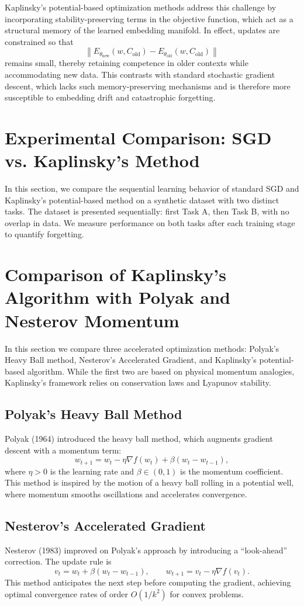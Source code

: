 \documentclass[12pt]{article}
\begin{document}
Kaplinsky's potential-based optimization methods address this challenge by incorporating 
stability-preserving terms in the objective function, which act as a structural memory 
of the learned embedding manifold. In effect, updates are constrained so that
\[
\left\| E_{\theta_{\mathrm{new}}}(w, C_{\mathrm{old}}) - E_{\theta_{\mathrm{old}}}(w, C_{\mathrm{old}}) \right\|
\]
remains small, thereby retaining competence in older contexts while accommodating new data. 
This contrasts with standard stochastic gradient descent, which lacks such 
memory-preserving mechanisms and is therefore more susceptible to embedding drift 
and catastrophic forgetting.

\section{Experimental Comparison: SGD vs. Kaplinsky's Method}

In this section, we compare the sequential learning behavior of standard SGD 
and Kaplinsky's potential-based method on a synthetic dataset with two distinct tasks. 
The dataset is presented sequentially: first Task A, then Task B, with no overlap in data. 
We measure performance on both tasks after each training stage to quantify forgetting.
\section{Comparison of Kaplinsky's Algorithm with Polyak and Nesterov Momentum}

In this section we compare three accelerated optimization methods: 
Polyak’s Heavy Ball method, Nesterov’s Accelerated Gradient, and Kaplinsky’s 
potential-based algorithm. While the first two are based on physical 
momentum analogies, Kaplinsky’s framework relies on conservation laws 
and Lyapunov stability.

\subsection{Polyak’s Heavy Ball Method}
Polyak (1964) introduced the heavy ball method, which augments gradient descent with a momentum term:
\[
    w_{t+1} = w_t - \eta \nabla f(w_t) + \beta (w_t - w_{t-1}),
\]
where $\eta > 0$ is the learning rate and $\beta \in (0,1)$ is the momentum coefficient. 
This method is inspired by the motion of a heavy ball rolling in a potential well, 
where momentum smooths oscillations and accelerates convergence.

\subsection{Nesterov’s Accelerated Gradient}
Nesterov (1983) improved on Polyak’s approach by introducing a 
``look-ahead'' correction. The update rule is
\[
    v_t = w_t + \beta (w_t - w_{t-1}), \qquad
    w_{t+1} = v_t - \eta \nabla f(v_t).
\]
This method anticipates the next step before computing the gradient,
achieving optimal convergence rates of order $O(1/k^2)$ for convex problems.
\end{document}
